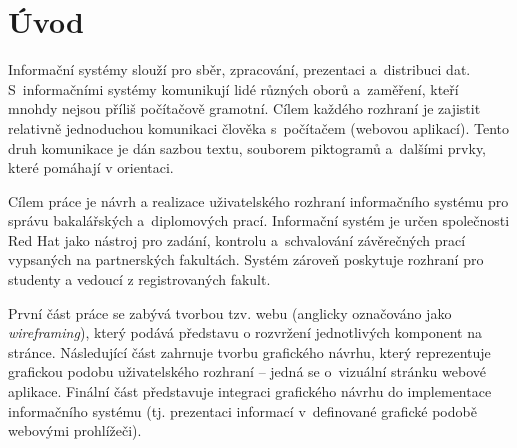 \chapter{Úvod}

Informační systémy slouží pro sběr, zpracování, prezentaci a~distribuci dat. S~informačními systémy komunikují lidé různých oborů a~zaměření, kteří mnohdy nejsou příliš počítačově gramotní. Cílem každého rozhraní je zajistit relativně jednoduchou komunikaci člověka s~počítačem (webovou aplikací). Tento druh komunikace je dán sazbou textu, souborem piktogramů a~dalšími prvky, které pomáhají v orientaci.

Cílem práce je návrh a realizace uživatelského rozhraní informačního systému pro správu bakalářských a~diplomových prací. Informační systém je určen společnosti Red Hat jako nástroj pro zadání, kontrolu a~schvalování závěrečných prací vypsaných na partnerských fakultách. Systém zároveň poskytuje rozhraní pro studenty a vedoucí z registrovaných fakult.

První část práce se zabývá tvorbou tzv.  webu (anglicky označováno jako \textit{wireframing}), který podává představu o rozvržení jednotlivých komponent na stránce. Následující část zahrnuje tvorbu grafického návrhu, který reprezentuje grafickou podobu uživatelského rozhraní -- jedná se o~vizuální stránku webové aplikace. Finální část představuje integraci grafického návrhu do implementace informačního systému (tj. prezentaci informací v~definované grafické podobě webovými prohlížeči).
